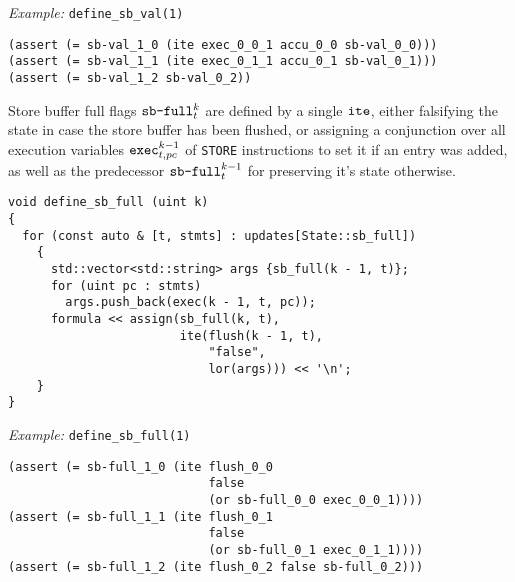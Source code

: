 \noindent
\emph{Example:} \lstinline[style=c++]{define_sb_val(1)}

\begin{lstlisting}[language=smtlib]
(assert (= sb-val_1_0 (ite exec_0_0_1 accu_0_0 sb-val_0_0)))
(assert (= sb-val_1_1 (ite exec_0_1_1 accu_0_1 sb-val_0_1)))
(assert (= sb-val_1_2 sb-val_0_2))
\end{lstlisting}


\noindent
Store buffer full flags $\texttt{sb-full}^k_t$ are defined by a single
$\texttt{ite}$, either falsifying the state in case the store buffer has been flushed,
or assigning a conjunction over all execution variables $\texttt{exec}^{k - 1}_{t, pc}$ of \lstinline[language={[concubine]Assembler}]{STORE} instructions to set it if an entry was added, as well as the predecessor $\texttt{sb-full}^{k - 1}_t$ for preserving it's state otherwise.

\begin{lstlisting}[style=c++]
void define_sb_full (uint k)
{
  for (const auto & [t, stmts] : updates[State::sb_full])
    {
      std::vector<std::string> args {sb_full(k - 1, t)};
      for (uint pc : stmts)
        args.push_back(exec(k - 1, t, pc));
      formula << assign(sb_full(k, t),
                        ite(flush(k - 1, t),
                            "false",
                            lor(args))) << '\n';
    }
}
\end{lstlisting}

\noindent
\emph{Example:} \lstinline[style=c++]{define_sb_full(1)}

\begin{lstlisting}[language=smtlib]
(assert (= sb-full_1_0 (ite flush_0_0
                            false
                            (or sb-full_0_0 exec_0_0_1))))
(assert (= sb-full_1_1 (ite flush_0_1
                            false
                            (or sb-full_0_1 exec_0_1_1))))
(assert (= sb-full_1_2 (ite flush_0_2 false sb-full_0_2)))
\end{lstlisting}

